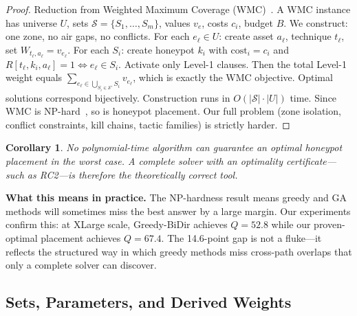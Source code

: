 \documentclass[journal]{IEEEtran}
\newtheorem{corollary}[theorem]{Corollary}
\begin{document}
\begin{proofbox}
\begin{proof}
Reduction from Weighted Maximum Coverage
(WMC)~\cite{feige1998}.
A WMC instance has universe $U$, sets
$\mathcal{S}=\{S_1,\ldots,S_m\}$, values $v_e$, costs $c_i$,
budget $B$.
We construct: one zone, no air gaps, no conflicts.
For each $e_\ell\in U$: create asset $a_\ell$, technique
$t_\ell$, set $W_{t_\ell,a_\ell}=v_{e_\ell}$.
For each $S_i$: create honeypot $k_i$ with
$\mathrm{cost}_i=c_i$ and $R[t_\ell,k_i,a_\ell]=1\iff
e_\ell\in S_i$.
Activate only Level-1 clauses.
Then the total Level-1 weight equals
$\sum_{e_\ell\in\bigcup_{S_i\in\mathcal{S}'}S_i}v_{e_\ell}$,
which is exactly the WMC objective.
Optimal solutions correspond bijectively.
Construction runs in $O(|\mathcal{S}|\cdot|U|)$ time.
Since WMC is NP-hard~\cite{feige1998}, so is honeypot
placement.
Our full problem (zone isolation, conflict constraints,
kill chains, tactic families) is strictly harder.
\end{proof}
\end{proofbox}

\begin{corollary}
No polynomial-time algorithm can guarantee an optimal
honeypot placement in the worst case.
A complete solver with an optimality certificate---such as
RC2---is therefore the theoretically correct tool.
\end{corollary}

\begin{examplebox}
\textbf{What this means in practice.}
The NP-hardness result means greedy and GA methods will
sometimes miss the best answer by a large margin.
Our experiments confirm this: at XLarge scale, Greedy-BiDir
achieves $Q=52.8$ while our proven-optimal placement achieves
$Q=67.4$.
The 14.6-point gap is not a fluke---it reflects the
structured way in which greedy methods miss cross-path
overlaps that only a complete solver can discover.
\end{examplebox}

\subsection{Sets, Parameters, and Derived Weights}
\end{document}
